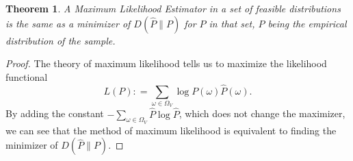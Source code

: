 \documentclass[12pt]{amsart}
\newcommand{\defas}{\mathrel{\mathop{:}}=}   %
\theoremstyle{plain}%
\newtheorem{thm}{Theorem}
\theoremstyle{definition}
\theoremstyle{remark}
\begin{document}
\begin{thm}
\label{sec:MLE-Lemma}
A Maximum Likelihood Estimator in a set of feasible distributions is
the same as a minimizer of $D(\hat{P}\parallel P)$ for $P$ in that
set, $\hat{P}$ being the empirical distribution of the sample.
\end{thm}
\begin{proof}
  The theory of maximum likelihood tells us to maximize the likelihood
  functional
  \begin{equation*}
    L(P) \defas \sum_{\omega \in \Omega_V} \log P(\omega) \hat{P}(\omega).
  \end{equation*}
  By adding the constant $- \sum_{\omega\in\Omega_V} \hat{P} \log
  \hat{P}$, which does not change the maximizer, we can see that the
  method of maximum likelihood is equivalent to finding the minimizer
  of $D(\hat{P}\parallel P)$.
\end{proof}
\end{document}
